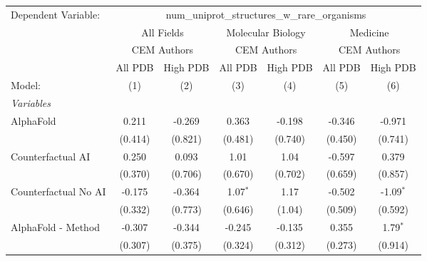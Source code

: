 \begingroup
\centering
\begin{tabular}{lcccccc}
   \tabularnewline \midrule \midrule
   Dependent Variable: & \multicolumn{6}{c}{num\_uniprot\_structures\_w\_rare\_organisms}\\
 & \multicolumn{2}{c}{All Fields} & \multicolumn{2}{c}{Molecular Biology} & \multicolumn{2}{c}{Medicine} \\
\cmidrule(lr){2-3} \cmidrule(lr){4-5} \cmidrule(lr){6-7}
 & \multicolumn{2}{c}{CEM Authors} & \multicolumn{2}{c}{CEM Authors} & \multicolumn{2}{c}{CEM Authors} \\
\cmidrule(lr){2-3} \cmidrule(lr){4-5} \cmidrule(lr){6-7}
 & \multicolumn{1}{c}{All PDB} & \multicolumn{1}{c}{High PDB} & \multicolumn{1}{c}{All PDB} & \multicolumn{1}{c}{High PDB} & \multicolumn{1}{c}{All PDB} & \multicolumn{1}{c}{High PDB} \\
\cmidrule(lr){2-2} \cmidrule(lr){3-3} \cmidrule(lr){4-4} \cmidrule(lr){5-5} \cmidrule(lr){6-6} \cmidrule(lr){7-7}
   Model:                                                     & (1)     & (2)     & (3)          & (4)     & (5)           & (6)\\  
   \midrule
   \emph{Variables}\\
   AlphaFold                                                  & 0.211   & -0.269  & 0.363        & -0.198  & -0.346        & -0.971\\   
                                                              & (0.414) & (0.821) & (0.481)      & (0.740) & (0.450)       & (0.741)\\   
   Counterfactual AI                                          & 0.250   & 0.093   & 1.01         & 1.04    & -0.597        & 0.379\\   
                                                              & (0.370) & (0.706) & (0.670)      & (0.702) & (0.659)       & (0.857)\\   
   Counterfactual No AI                                       & -0.175  & -0.364  & 1.07$^{*}$   & 1.17    & -0.502        & -1.09$^{*}$\\   
                                                              & (0.332) & (0.773) & (0.646)      & (1.04)  & (0.509)       & (0.592)\\   
   AlphaFold - Method                                         & -0.307  & -0.344  & -0.245       & -0.135  & 0.355         & 1.79$^{*}$\\   
                                                              & (0.307) & (0.375) & (0.324)      & (0.312) & (0.273)       & (0.914)\\   

\end{tabular}
